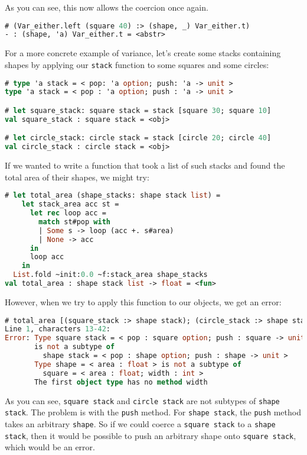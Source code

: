 As you can see, this now allows the coercion once again.

\begin{lstlisting}[language=Caml]
# (Var_either.left (square 40) :> (shape, _) Var_either.t)
- : (shape, 'a) Var_either.t = <abstr>
\end{lstlisting}

For a more concrete example of variance, let's create some stacks
containing shapes by applying our \passthrough{\lstinline!stack!}
function to some squares and some circles:

\begin{lstlisting}[language=Caml]
# type 'a stack = < pop: 'a option; push: 'a -> unit >
type 'a stack = < pop : 'a option; push : 'a -> unit >

# let square_stack: square stack = stack [square 30; square 10]
val square_stack : square stack = <obj>

# let circle_stack: circle stack = stack [circle 20; circle 40]
val circle_stack : circle stack = <obj>
\end{lstlisting}

If we wanted to write a function that took a list of such stacks and
found the total area of their shapes, we might try:

\begin{lstlisting}[language=Caml]
# let total_area (shape_stacks: shape stack list) =
    let stack_area acc st =
      let rec loop acc =
        match st#pop with
        | Some s -> loop (acc +. s#area)
        | None -> acc
      in
      loop acc
    in
  List.fold ~init:0.0 ~f:stack_area shape_stacks
val total_area : shape stack list -> float = <fun>
\end{lstlisting}

However, when we try to apply this function to our objects, we get an
error:

\begin{lstlisting}[language=Caml]
# total_area [(square_stack :> shape stack); (circle_stack :> shape stack)]
Line 1, characters 13-42:
Error: Type square stack = < pop : square option; push : square -> unit >
       is not a subtype of
         shape stack = < pop : shape option; push : shape -> unit >
       Type shape = < area : float > is not a subtype of
         square = < area : float; width : int >
       The first object type has no method width
\end{lstlisting}

As you can see, \passthrough{\lstinline!square stack!} and
\passthrough{\lstinline!circle stack!} are not subtypes of
\passthrough{\lstinline!shape stack!}. The problem is with the
\passthrough{\lstinline!push!} method. For
\passthrough{\lstinline!shape stack!}, the
\passthrough{\lstinline!push!} method takes an arbitrary
\passthrough{\lstinline!shape!}. So if we could coerce a
\passthrough{\lstinline!square stack!} to a
\passthrough{\lstinline!shape stack!}, then it would be possible to push
an arbitrary shape onto \passthrough{\lstinline!square stack!}, which
would be an error.

